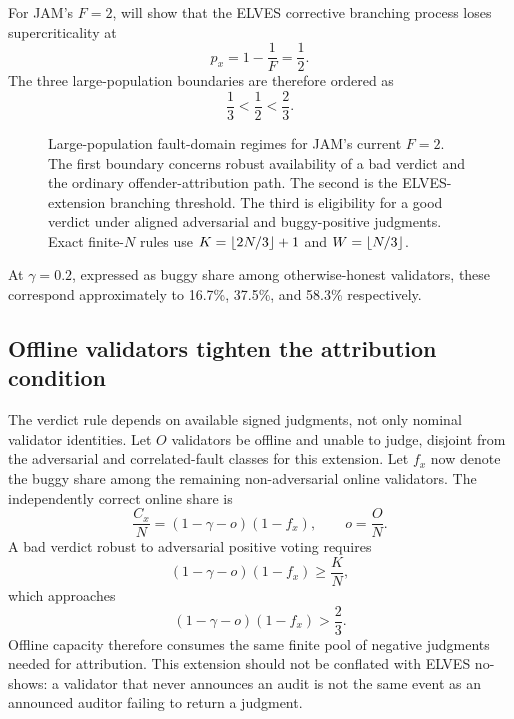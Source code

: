 For JAM's \(F=2\),  will show that the ELVES corrective branching process loses supercriticality at
\[
p_x=1-\frac1F=\frac12.
\]
The three large-population boundaries are therefore ordered as
\[
\boxed{
\frac13
<
\frac12
<
\frac23.
}
\]

\begin{figure}[htbp]
\centering

\caption{Large-population fault-domain regimes for JAM's current \(F=2\). The first boundary concerns robust availability of a bad verdict and the ordinary offender-attribution path. The second is the ELVES-extension branching threshold. The third is eligibility for a good verdict under aligned adversarial and buggy-positive judgments. Exact finite-\(N\) rules use \(K=\left\lfloor 2N/3\right\rfloor+1\) and \(W=\left\lfloor N/3\right\rfloor\).}
\label{fig:thresholds}
\end{figure}

At \(\gamma=0.2\), expressed as buggy share among otherwise-honest validators, these correspond approximately to 16.7\%, 37.5\%, and 58.3\% respectively.

\subsection{Offline validators tighten the attribution condition}

The verdict rule depends on available signed judgments, not only nominal validator identities. Let \(O\) validators be offline and unable to judge, disjoint from the adversarial and correlated-fault classes for this extension. Let \(f_x\) now denote the buggy share among the remaining non-adversarial online validators. The independently correct online share is
\[
\frac{C_x}{N}=(1-\gamma-o)(1-f_x),
\qquad o=\frac{O}{N}.
\]
A bad verdict robust to adversarial positive voting requires
\[
\boxed{
(1-\gamma-o)(1-f_x)\ge\frac{K}{N},
}
\]
which approaches
\[
(1-\gamma-o)(1-f_x)>\frac23.
\]
Offline capacity therefore consumes the same finite pool of negative judgments needed for attribution. This extension should not be conflated with ELVES no-shows: a validator that never announces an audit is not the same event as an announced auditor failing to return a judgment.
